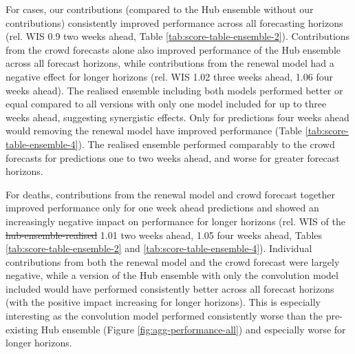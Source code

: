 \documentclass[10pt,letterpaper]{article} %
\providecommand{\DIFaddtex}[1]{{\protect\color{blue}\uwave{#1}}} %
\providecommand{\DIFdeltex}[1]{{\protect\color{red}\sout{#1}}}                      %
\providecommand{\DIFaddbegin}{} %
\providecommand{\DIFaddend}{} %
\providecommand{\DIFdelbegin}{} %
\providecommand{\DIFdelend}{} %
\providecommand{\DIFadd}[1]{\texorpdfstring{\DIFaddtex{#1}}{#1}} %
\providecommand{\DIFdel}[1]{\texorpdfstring{\DIFdeltex{#1}}{}} %
\newcommand{\DIFscaledelfig}{0.5}
\newlength{\DIFdelgraphicswidth} %
\newlength{\DIFdelgraphicsheight} %
\newcommand{\DIFaddincludegraphics}[2][]{{\color{blue}\fbox{\DIFOincludegraphics[#1]{#2}}}} %
\newcommand{\DIFdelincludegraphics}[2][]{%
\sbox{\DIFdelgraphicsbox}{\DIFOincludegraphics[#1]{#2}}%
\settoboxwidth{\DIFdelgraphicswidth}{\DIFdelgraphicsbox} %
\settoboxtotalheight{\DIFdelgraphicsheight}{\DIFdelgraphicsbox} %
\scalebox{\DIFscaledelfig}{%
\parbox[b]{\DIFdelgraphicswidth}{\usebox{\DIFdelgraphicsbox}\\[-\baselineskip] \rule{\DIFdelgraphicswidth}{0em}}\llap{\resizebox{\DIFdelgraphicswidth}{\DIFdelgraphicsheight}{%
\setlength{\unitlength}{\DIFdelgraphicswidth}%
\begin{picture}(1,1)%
\thicklines\linethickness{2pt} %
{\color[rgb]{1,0,0}\put(0,0){\framebox(1,1){}}}%
{\color[rgb]{1,0,0}\put(0,0){\line( 1,1){1}}}%
{\color[rgb]{1,0,0}\put(0,1){\line(1,-1){1}}}%
\end{picture}%
}\hspace*{3pt}}} %
} %
\DeclareRobustCommand{\DIFaddbegin}{\DIFOaddbegin \let\includegraphics\DIFaddincludegraphics} %
\DeclareRobustCommand{\DIFaddend}{\DIFOaddend \let\includegraphics\DIFOincludegraphics} %
\DeclareRobustCommand{\DIFdelbegin}{\DIFOdelbegin \let\includegraphics\DIFdelincludegraphics} %
\DeclareRobustCommand{\DIFdelend}{\DIFOaddend \let\includegraphics\DIFOincludegraphics} %
\begin{document}
For cases, our contributions (compared to the Hub ensemble without our
contributions) consistently improved performance across all forecasting
horizons (rel. WIS 0.9 two weeks ahead, Table
\ref{tab:score-table-ensemble-2}). Contributions from the crowd
forecasts alone also improved performance of the Hub ensemble across all
forecast horizons, while contributions from the renewal model had a
negative effect for longer horizons (rel. WIS 1.02 three weeks ahead,
1.06 four weeks ahead). The realised ensemble including both models
performed better or equal compared to all versions with only one model
included for up to three weeks ahead, suggesting synergistic effects.
Only for predictions four weeks ahead would removing the renewal model
have improved performance (Table \ref{tab:score-table-ensemble-4}). The
realised ensemble performed comparably to the crowd forecasts for
predictions one to two weeks ahead, and worse for greater forecast
horizons.

For deaths, contributions from the renewal model and crowd forecast
together improved performance only for one week ahead predictions and
showed an increasingly negative impact on performance for longer
horizons (rel. WIS of the \DIFdelbegin \DIFdel{hub-ensemble-realised }\DIFdelend \DIFaddbegin \DIFadd{Hub-ensemble-realised }\DIFaddend 1.01 two weeks ahead,
1.05 four weeks ahead, Tables \ref{tab:score-table-ensemble-2} and
\ref{tab:score-table-ensemble-4}). Individual contributions from both
the renewal model and the crowd forecast were largely negative, while a
version of the Hub ensemble with only the convolution model included
would have performed consistently better across all forecast horizons
(with the positive impact increasing for longer horizons). This is
especially interesting as the convolution model performed consistently
worse than the pre-existing Hub ensemble (Figure
\ref{fig:agg-performance-all}) and especially worse for longer horizons.
\end{document}
